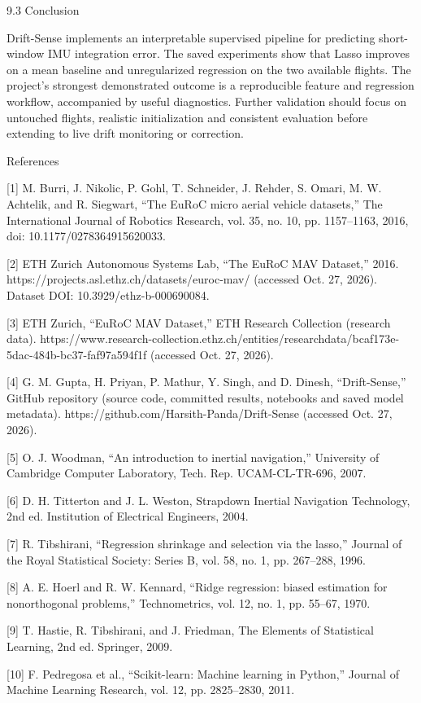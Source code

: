 \documentclass[
  11pt,
]{article}
\begin{document}
9.3 Conclusion

Drift-Sense implements an interpretable supervised pipeline for predicting short-window IMU integration error. The saved experiments show that Lasso improves on a mean baseline and unregularized regression on the two available flights. The project's strongest demonstrated outcome is a reproducible feature and regression workflow, accompanied by useful diagnostics. Further validation should focus on untouched flights, realistic initialization and consistent evaluation before extending to live drift monitoring or correction.

References

{[}1{]} M. Burri, J. Nikolic, P. Gohl, T. Schneider, J. Rehder, S. Omari, M. W. Achtelik, and R. Siegwart, ``The EuRoC micro aerial vehicle datasets,'' The International Journal of Robotics Research, vol. 35, no. 10, pp. 1157--1163, 2016, doi: 10.1177/0278364915620033.

{[}2{]} ETH Zurich Autonomous Systems Lab, ``The EuRoC MAV Dataset,'' 2016. https://projects.asl.ethz.ch/datasets/euroc-mav/ (accessed Oct. 27, 2026). Dataset DOI: 10.3929/ethz-b-000690084.

{[}3{]} ETH Zurich, ``EuRoC MAV Dataset,'' ETH Research Collection (research data). https://www.research-collection.ethz.ch/entities/researchdata/bcaf173e-5dac-484b-bc37-faf97a594f1f (accessed Oct. 27, 2026).

{[}4{]} G. M. Gupta, H. Priyan, P. Mathur, Y. Singh, and D. Dinesh, ``Drift-Sense,'' GitHub repository (source code, committed results, notebooks and saved model metadata). https://github.com/Harsith-Panda/Drift-Sense (accessed Oct. 27, 2026).

{[}5{]} O. J. Woodman, ``An introduction to inertial navigation,'' University of Cambridge Computer Laboratory, Tech. Rep. UCAM-CL-TR-696, 2007.

{[}6{]} D. H. Titterton and J. L. Weston, Strapdown Inertial Navigation Technology, 2nd ed. Institution of Electrical Engineers, 2004.

{[}7{]} R. Tibshirani, ``Regression shrinkage and selection via the lasso,'' Journal of the Royal Statistical Society: Series B, vol. 58, no. 1, pp. 267--288, 1996.

{[}8{]} A. E. Hoerl and R. W. Kennard, ``Ridge regression: biased estimation for nonorthogonal problems,'' Technometrics, vol. 12, no. 1, pp. 55--67, 1970.

{[}9{]} T. Hastie, R. Tibshirani, and J. Friedman, The Elements of Statistical Learning, 2nd ed. Springer, 2009.

{[}10{]} F. Pedregosa et al., ``Scikit-learn: Machine learning in Python,'' Journal of Machine Learning Research, vol. 12, pp. 2825--2830, 2011.
\end{document}
